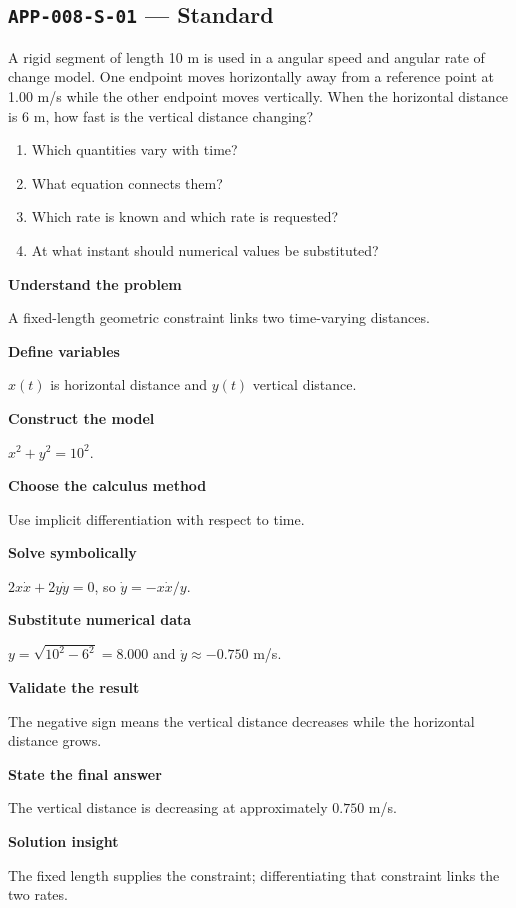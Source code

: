 \documentclass[11pt]{book}
\newcommand{\pid}[1]{\texttt{#1}}
\begin{document}
\subsection*{\pid{APP-008-S-01} — Standard}
\begin{problembox}
A rigid segment of length 10 m is used in a angular speed and angular rate of change model. One endpoint moves horizontally away from a reference point at 1.00 m/s while the other endpoint moves vertically. When the horizontal distance is 6 m, how fast is the vertical distance changing?
\end{problembox}
\begin{promptbox}\begin{enumerate}
\item Which quantities vary with time?
\item What equation connects them?
\item Which rate is known and which rate is requested?
\item At what instant should numerical values be substituted?
\end{enumerate}\end{promptbox}
\begin{solutionbox}
\textbf{Understand the problem}\par A fixed-length geometric constraint links two time-varying distances.\par\medskip
\textbf{Define variables}\par $x(t)$ is horizontal distance and $y(t)$ vertical distance.\par\medskip
\textbf{Construct the model}\par $x^2+y^2=10^2$.\par\medskip
\textbf{Choose the calculus method}\par Use implicit differentiation with respect to time.\par\medskip
\textbf{Solve symbolically}\par $2x\dot x+2y\dot y=0$, so $\dot y=-x\dot x/y$.\par\medskip
\textbf{Substitute numerical data}\par $y=\sqrt{10^2-6^2}=8.000$ and $\dot y\approx -0.750$ m/s.\par\medskip
\textbf{Validate the result}\par The negative sign means the vertical distance decreases while the horizontal distance grows.\par\medskip
\textbf{State the final answer}\par The vertical distance is decreasing at approximately $0.750$ m/s.\par\medskip
\textbf{Solution insight}\par The fixed length supplies the constraint; differentiating that constraint links the two rates.\par\medskip
\end{solutionbox}
\end{document}
